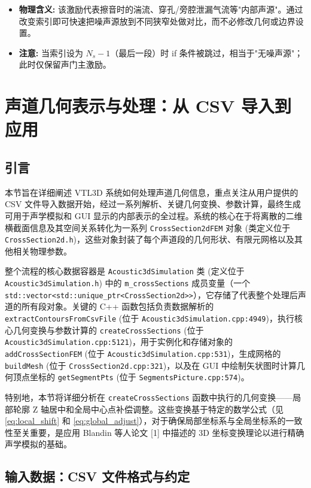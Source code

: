 \documentclass{ctexart}
\begin{document}
\begin{itemize}
\begin{itemize}
            \item \textbf{物理含义:} 该激励代表擦音时的湍流、穿孔/旁腔泄漏气流等"内部声源"。通过改变索引即可快速把噪声源放到不同狭窄处做对比，而不必修改几何或边界设置。
            \item \textbf{注意:} 当索引设为 $N_s-1$（最后一段）时 if 条件被跳过，相当于"无噪声源"；此时仅保留声门主激励。
        \end{itemize}
\end{itemize}

\section{声道几何表示与处理：从 CSV 导入到应用}

\subsection{引言}
本节旨在详细阐述 VTL3D 系统如何处理声道几何信息，重点关注从用户提供的 CSV 文件导入数据开始，经过一系列解析、关键几何变换、参数计算，最终生成可用于声学模拟和 GUI 显示的内部表示的全过程。系统的核心在于将离散的二维横截面信息及其空间关系转化为一系列 \texttt{CrossSection2dFEM} 对象 (类定义位于 \texttt{CrossSection2d.h})，这些对象封装了每个声道段的几何形状、有限元网格以及其他相关物理参数。

整个流程的核心数据容器是 \texttt{Acoustic3dSimulation} 类 (定义位于 \texttt{Acoustic3dSimulation.h}) 中的 \texttt{m\_crossSections} 成员变量（一个 \texttt{std::vector<std::unique\_ptr<CrossSection2d>>}），它存储了代表整个处理后声道的所有段对象。关键的 C++ 函数包括负责数据解析的 \texttt{extractContoursFromCsvFile} (位于 \texttt{Acoustic3dSimulation.cpp:4949})，执行核心几何变换与参数计算的 \texttt{createCrossSections} (位于 \texttt{Acoustic3dSimulation.cpp:5121})，用于实例化和存储对象的 \texttt{addCrossSectionFEM} (位于 \texttt{Acoustic3dSimulation.cpp:531})，生成网格的 \texttt{buildMesh} (位于 \texttt{CrossSection2d.cpp:321})，以及在 GUI 中绘制矢状图时计算几何顶点坐标的 \texttt{getSegmentPts} (位于 \texttt{SegmentsPicture.cpp:574})。

特别地，本节将详细分析在 \texttt{createCrossSections} 函数中执行的几何变换——局部轮廓 Z 轴居中和全局中心点补偿调整。这些变换基于特定的数学公式（见 \eqref{eq:local_shift} 和 \eqref{eq:global_adjust}），对于确保局部坐标系与全局坐标系的一致性至关重要，是应用 Blandin 等人论文 [1] 中描述的 3D 坐标变换理论以进行精确声学模拟的基础。

\subsection{输入数据：CSV 文件格式与约定}
\end{document}
